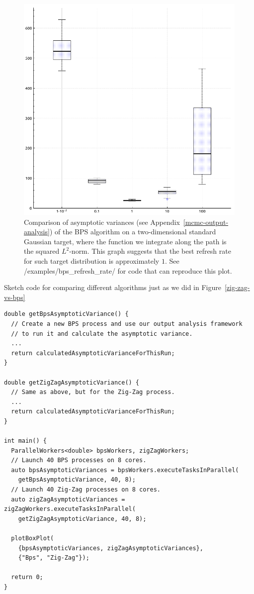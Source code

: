 \documentclass[report.tex]{subfiles}
\begin{document}
\begin{figure}
  \centering
  \includegraphics[width=.45\textwidth]{img/bps_refresh_rates}
  \caption{Comparison of asymptotic variances (see Appendix~\ref{mcmc-output-analysis})
           of the BPS algorithm on a two-dimensional standard Gaussian target, where
           the function we integrate along the path is the squared $L^{2}$-norm.
           This graph suggests that the best refresh rate for such target distribution
           is approximately $1$. See /examples/bps\_refresh\_rate/ for code that can
           reproduce this plot.}
  \label{refresh-rate-how-to-fit}
\end{figure}


\begin{lstfloat}
\caption{Sketch code for comparing different algorithms just as we did in Figure~\ref{zig-zag-vs-bps}}
\label{bps-vs-zig-zag-code}
\begin{lstlisting}
double getBpsAsymptoticVariance() {
  // Create a new BPS process and use our output analysis framework
  // to run it and calculate the asymptotic variance.
  ...
  return calculatedAsymptoticVarianceForThisRun;
}

double getZigZagAsymptoticVariance() {
  // Same as above, but for the Zig-Zag process.
  ...
  return calculatedAsymptoticVarianceForThisRun;
}

int main() {
  ParallelWorkers<double> bpsWorkers, zigZagWorkers;
  // Launch 40 BPS processes on 8 cores.
  auto bpsAsymptoticVariances = bpsWorkers.executeTasksInParallel(
    getBpsAsymptoticVariance, 40, 8);
  // Launch 40 Zig-Zag processes on 8 cores.
  auto zigZagAsymptoticVariances = zigZagWorkers.executeTasksInParallel(
    getZigZagAsymptoticVariance, 40, 8);

  plotBoxPlot(
    {bpsAsymptoticVariances, zigZagAsymptoticVariances},
    {"Bps", "Zig-Zag"});

  return 0;
}
\end{lstlisting}
\end{lstfloat}
\end{document}
